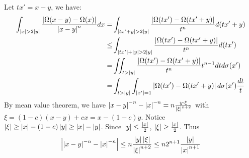 \begin{remark}
    Let $tx'=x-y$, we have:
    \begin{align*}
        \int_{\abs{x}>2\abs{y}}{\frac{\abs{\Omega(x-y)-\Omega(x)}}{\abs{x-y}^n}dx}= & \int_{\abs{tx'+y}>2\abs{y}}{\frac{\abs{\Omega(tx')-\Omega(tx'+y)}}{t^n}d(tx'+y)}            \\
        \leq                                                                        & \int_{\abs{tx'}+\abs{y}>2\abs{y}}{\frac{\abs{\Omega(tx')-\Omega(tx'+y)}}{t^n}d(tx')}        \\
        =                                                                           & \iint_{{t}>\abs{y}}{\frac{\abs{\Omega(tx')-\Omega(tx'+y)}}{t^n}t^{n-1}d t d\sigma(x')}        \\
        =                                                                           & \int_{{t}>\abs{y}}\int_{\abs{x'}=1}{\abs{\Omega(tx')-\Omega(tx'+y)}d\sigma(x')\frac{dt}{t}}
    \end{align*}
   By mean value theorem, we have $\abs{x-y}^{-n}-\abs{x}^{-n}=n\frac{y\cdot \xi}{\abs{\xi}^{n+2}}$ with $\xi=(1-c)(x-y)+cx=x-(1-c)y$. Notice $\abs{\xi}\geq \abs{x}-(1-c)\abs{y}\geq \abs{x}-\abs{y}$. Since $\abs{y}\leq \frac{\abs{x}}{2}$, $\abs{\xi}\geq \frac{\abs{x}}{2}$. Thus 
    \begin{equation*}
        \abs{\abs{x-y}^{-n}-\abs{x}^{-n}}\leq n\frac{\abs{y}\abs{ \xi}}{\abs{\xi}^{n+2}}\leq n2^{n+1}\frac{\abs{y}}{\abs{x}^{n+1}}
    \end{equation*}
\end{remark}
% 



